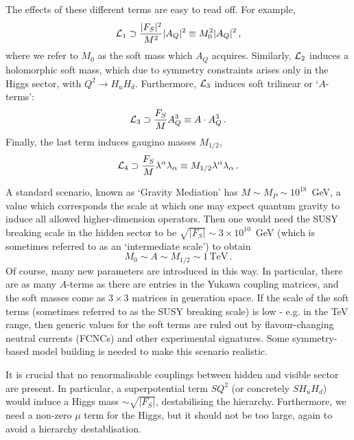 \documentclass[12pt]{article}
\newcommand{\be}{\begin{equation}}
\newcommand{\ee}{\end{equation}}
\numberwithin{equation}{section}
\begin{document}
The effects of these different terms are easy to read off. For example,
\be
{\cal L}_1\supset \frac{|F_S|^2}{M^2}|A_Q|^2\equiv M_0^2|A_Q|^2\,,
\ee
where we refer to $M_0$ as the soft mass which $A_Q$ acquires. Similarly, ${\cal L}_2$ induces a holomorphic soft mass, which due to symmetry constraints arises only in the Higgs sector, with $Q^2\to H_u H_d$. Furthermore, ${\cal L}_3$ induces soft trilinear or `$A$-terms':
\be
{\cal L}_3\supset \frac{F_S}{M}A_Q^3\equiv A\cdot A_Q^3\,. 
\ee
Finally, the last term induces gaugino masses $M_{1/2}$,
\be
{\cal L}_4\supset \frac{F_S}{M}\lambda^\alpha \lambda_\alpha \equiv M_{1/2}\lambda^\alpha\lambda_\alpha\,.
\ee

A standard scenario, known as `Gravity Mediation' has $M\sim M_P\sim 10^{18}$~GeV, a value which corresponds the scale at which one may expect quantum gravity to induce all allowed higher-dimension operators. Then one would need the SUSY breaking scale in the hidden sector to be $\sqrt{|F_S|}\sim 3\times 10^{10}$~GeV (which is sometimes referred to as an `intermediate scale') to obtain 
\be
M_0\sim A\sim M_{1/2} \sim 1\,\mbox{TeV}\,.
\ee
Of course, many new parameters are introduced in this way. In particular, there are as many $A$-terms as there are entries in the Yukawa coupling matrices, and the soft masses come as $3\times 3$ matrices in generation space. If the scale of the soft terms (sometimes referred to as the SUSY breaking scale) is low - e.g. in the TeV range, then generic values for the soft terms are ruled out by flavour-changing neutral currents (FCNCs) and other experimental signatures. Some symmetry-based model building is needed to make this scenario realistic. 

It is crucial that no renormalisable couplings between hidden and visible sector are present. In particular, a superpotential term $SQ^2$ (or concretely $SH_uH_d$) would induce a Higgs mass $\sim \sqrt{|F_S|}$, destabilising the hierarchy. Furthermore, we need a non-zero $\mu$ term for the Higgs, but it should not be too large, again to avoid a hierarchy destablisation.  
\end{document}
